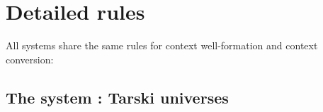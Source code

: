 \section{Detailed rules}\label{appendix:rules}

All systems share the same rules for context well-formation and context conversion:


\subsection{The system \ThyTarski : Tarski universes}

